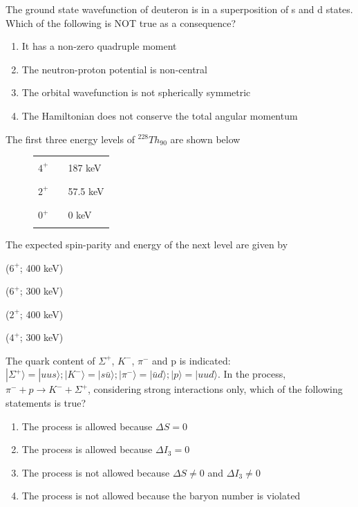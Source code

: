 \documentclass{exam}
\begin{document}
\begin{questions}
\question The ground state wavefunction of deuteron is in a superposition of s and d states. Which of the following is NOT true as a consequence?\hfill{}

\begin{enumerate}
	\item It has a non-zero quadruple moment \item The neutron-proton potential is non-central
	\item The orbital wavefunction is not spherically symmetric \item The Hamiltonian does not conserve the total angular momentum
\end{enumerate}

\question The first three energy levels of ${}^{228}Th_{90}$ are shown below
	\begin{figure}[H] \centering
	\begin{tabular}{r c l}
		$4^+$ & \rule{3cm}{0.4pt} & 187 keV \\
		$2^+$ & \rule{3cm}{0.4pt} & 57.5 keV \\
		$0^+$ & \rule{3cm}{0.4pt} & 0 keV \\
	\end{tabular}
	\end{figure}
The expected spin-parity and energy of the next level are given by\hfill{}

\begin{enumerate} \begin{multicols}{4}
	\item ($6^+$; 400 keV) \item ($6^+$; 300 keV) \item ($2^+$; 400 keV) \item ($4^+$; 300 keV)
\end{multicols} \end{enumerate}

\question The quark content of $\Sigma^{+}$, $K^{-}$, $\pi^{-}$ and p is indicated: $|\Sigma^{+}\rangle=|uus\rangle; |K^{-}\rangle=|s\bar{u}\rangle; |\pi^{-}\rangle=|\bar{u}d\rangle; |p\rangle=|uud\rangle$. In the process, $\pi^{-} + p \rightarrow K^{-} + \Sigma^{+}$, considering strong interactions only, which of the following statements is true?\hfill{}

\begin{enumerate}
	\item The process is allowed because $\Delta S = 0$
	\item The process is allowed because $\Delta I_3 = 0$
	\item The process is not allowed because $\Delta S \neq 0$ and $\Delta I_3 \neq 0$
	\item The process is not allowed because the baryon number is violated
\end{enumerate}


\end{questions}
\end{document}
